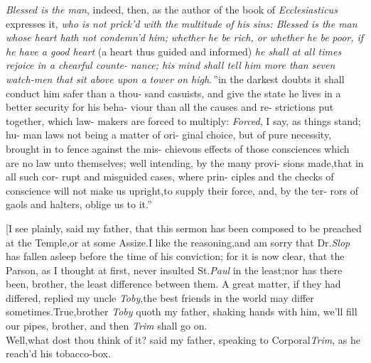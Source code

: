 \documentclass{article}
\begin{document}
\lqq \textit{Blessed is the man}, indeed, then, as\break
\lqq the author of the book of \textit{Ecclesiasticus}\break
\lqq expresses it, \textit{who is not prick’d with the}\break
\lqq \textit{multitude of his sins: Blessed is the man}\break
\lqq \textit{whose heart hath not condemn’d him;}\break
\lqq \textit{whether he be rich, or whether he be}\break
\lqq \textit{poor, if he have a good heart} (a heart\break
\lqq thus guided and informed) \textit{he shall at}\break
\lqq \textit{all times rejoice in a chearful counte-}\break
\lqq \textit{nance; his mind shall tell him more than}
\lqq \textit{seven watch-men that sit above upon a}\break
\lqq \textit{tower on high}.\,” \lqq in the darkest doubts\break
\lqq it shall conduct him safer than a thou-\break
\lqq sand casuists, and give the state he\break
\lqq lives in a better security for his beha-\break
\lqq viour than all the causes and re-\break
\lqq strictions put together, which law-\break
\lqq makers are forced to multiply:\tsh\break
\lqq \textit{Forced}, I say, as things stand; hu-\break
\lqq man laws not being a matter of ori-\break
\lqq ginal choice, but of pure necessity,\break
\lqq brought in to fence against the mis-\break
\lqq chievous effects of those consciences\break
\lqq which are no law unto themselves;\break
\lqq well intending, by the many provi-\break
\lqq sions made,\tsh that in all such cor-\break
\lqq rupt and misguided cases, where prin-\break
\lqq ciples and the checks of conscience\break
\lqq will not make us upright,\tsh to
\lqq supply their force, and, by the ter-\break
\lqq rors of gaols and halters, oblige us\break
\lqq to it.”

[I see plainly, said my father, that\break
this sermon has been composed to be\break 
preached at the Temple,\tsh or at some
Assize.\tsh I like the reasoning,\tsh and
am sorry that Dr.\@ \textit{Slop} has fallen asleep
before the time of his conviction;\tsh\break
for it is now clear, that the Parson, as
I thought at first, never insulted St.\@ \textit{Paul}
in the least;\tsk nor has there been, bro\-ther, the least difference
between them.\break
\tsh A great matter, if they had differed,
replied my uncle \textit{Toby},\tsk the best friends in the world
may differ sometimes.\tsh True,\tsk brother \textit{Toby}
quoth my father, shaking hands with him,\tsk\break
we’ll fill our pipes, brother, and then\break
\textit{Trim} shall go on.\\
\newpage
Well,\tsk what dost thou think of it? said my father,
speaking to Corporal\break \textit{Trim}, as he reach’d his
tobacco-box.
\end{document}
